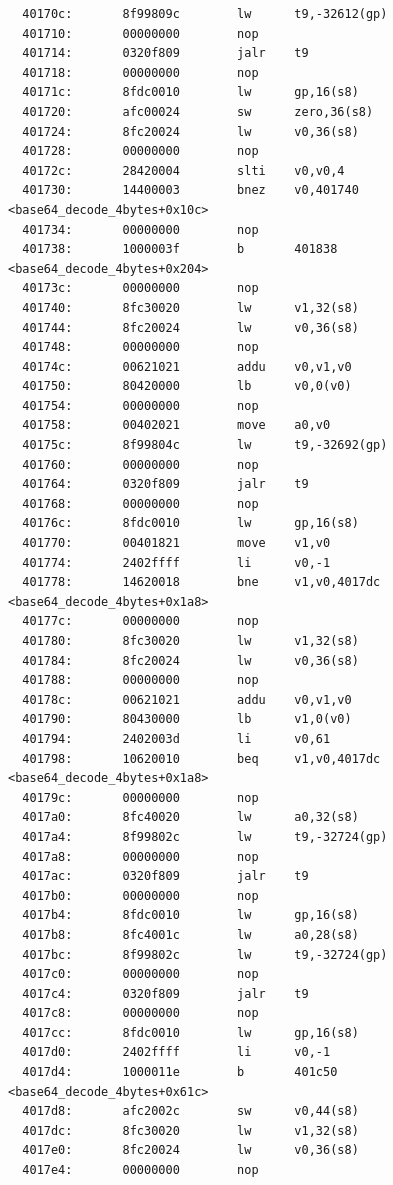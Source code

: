 \documentclass[11pt]{article}
\begin{document}
\begin{verbatim}
  40170c:       8f99809c        lw      t9,-32612(gp)
  401710:       00000000        nop
  401714:       0320f809        jalr    t9
  401718:       00000000        nop
  40171c:       8fdc0010        lw      gp,16(s8)
  401720:       afc00024        sw      zero,36(s8)
  401724:       8fc20024        lw      v0,36(s8)
  401728:       00000000        nop
  40172c:       28420004        slti    v0,v0,4
  401730:       14400003        bnez    v0,401740 <base64_decode_4bytes+0x10c>
  401734:       00000000        nop
  401738:       1000003f        b       401838 <base64_decode_4bytes+0x204>
  40173c:       00000000        nop
  401740:       8fc30020        lw      v1,32(s8)
  401744:       8fc20024        lw      v0,36(s8)
  401748:       00000000        nop
  40174c:       00621021        addu    v0,v1,v0
  401750:       80420000        lb      v0,0(v0)
  401754:       00000000        nop
  401758:       00402021        move    a0,v0
  40175c:       8f99804c        lw      t9,-32692(gp)
  401760:       00000000        nop
  401764:       0320f809        jalr    t9
  401768:       00000000        nop
  40176c:       8fdc0010        lw      gp,16(s8)
  401770:       00401821        move    v1,v0
  401774:       2402ffff        li      v0,-1
  401778:       14620018        bne     v1,v0,4017dc <base64_decode_4bytes+0x1a8>
  40177c:       00000000        nop
  401780:       8fc30020        lw      v1,32(s8)
  401784:       8fc20024        lw      v0,36(s8)
  401788:       00000000        nop
  40178c:       00621021        addu    v0,v1,v0
  401790:       80430000        lb      v1,0(v0)
  401794:       2402003d        li      v0,61
  401798:       10620010        beq     v1,v0,4017dc <base64_decode_4bytes+0x1a8>
  40179c:       00000000        nop
  4017a0:       8fc40020        lw      a0,32(s8)
  4017a4:       8f99802c        lw      t9,-32724(gp)
  4017a8:       00000000        nop
  4017ac:       0320f809        jalr    t9
  4017b0:       00000000        nop
  4017b4:       8fdc0010        lw      gp,16(s8)
  4017b8:       8fc4001c        lw      a0,28(s8)
  4017bc:       8f99802c        lw      t9,-32724(gp)
  4017c0:       00000000        nop
  4017c4:       0320f809        jalr    t9
  4017c8:       00000000        nop
  4017cc:       8fdc0010        lw      gp,16(s8)
  4017d0:       2402ffff        li      v0,-1
  4017d4:       1000011e        b       401c50 <base64_decode_4bytes+0x61c>
  4017d8:       afc2002c        sw      v0,44(s8)
  4017dc:       8fc30020        lw      v1,32(s8)
  4017e0:       8fc20024        lw      v0,36(s8)
  4017e4:       00000000        nop

\end{verbatim}
\end{document}
